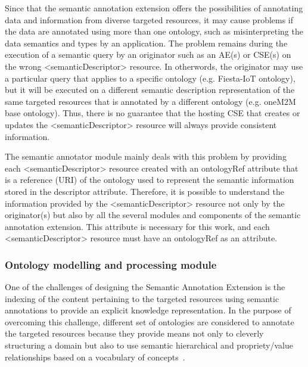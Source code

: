 Since that the semantic annotation extension offers the possibilities of annotating data and information from diverse targeted resources, it may cause problems if the data are annotated using more than one ontology, such as misinterpreting the data semantics and types by an application. The problem remains during the execution of a semantic query by an originator such as an AE(s) or CSE(s) on the wrong <semanticDescriptor> resource. In otherwords, the originator may use a particular query that applies to a specific ontology (e.g. Fiesta-IoT ontology), but it will be executed on a different semantic description representation of the same targeted resources that is annotated by a different ontology (e.g. oneM2M base ontology). Thus, there is no guarantee that the hosting CSE that creates or updates the <semanticDescriptor> resource will always provide consistent information.\par
The semantic annotator module mainly deals with this problem by providing each <semanticDescriptor> resource created with an ontologyRef attribute that is a reference (URI) of the ontology used to represent the semantic information stored in the descriptor attribute. Therefore, it is possible to understand  the information provided by the <semanticDescriptor> resource not only by the originator(s) but also by all the several modules and components of the semantic annotation extension. This attribute is necessary for this work, and each <semanticDescriptor> resource must have an ontologyRef as an attribute.




\subsubsection{Ontology modelling and processing module}

One of the challenges of designing the Semantic Annotation Extension is the indexing of the content pertaining to the targeted resources using semantic annotations to provide an explicit knowledge representation. In the purpose of overcoming this challenge, different set of ontologies are considered to annotate the targeted resources because they provide means not only to cleverly structuring a domain but also to use semantic hierarchical and propriety/value relationships based on a vocabulary of concepts~\cite{ontology}.\PAR


